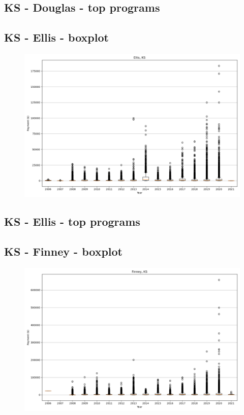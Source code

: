\subsection*{KS - Douglas - top programs}

\newpage
\subsection*{KS - Ellis - boxplot}
\begin{figure}[h]
\centering
\includegraphics[width=7in]{../output/boxplots/counties/Ellis-KS_boxplot.png}
\end{figure}


\subsection*{KS - Ellis - top programs}

\newpage
\subsection*{KS - Finney - boxplot}
\begin{figure}[h]
\centering
\includegraphics[width=7in]{../output/boxplots/counties/Finney-KS_boxplot.png}
\end{figure}


